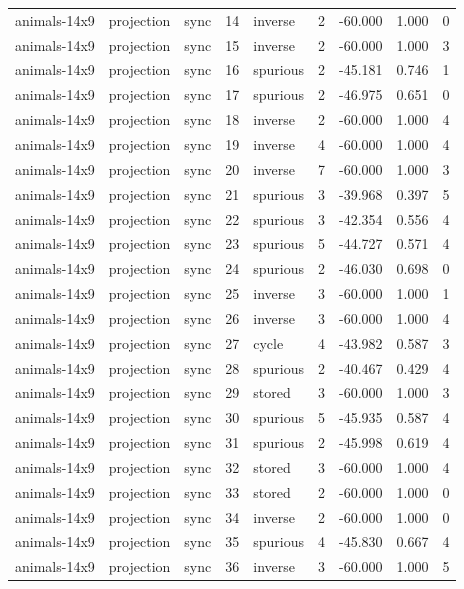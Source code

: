 \begin{tabular}{lllrlrrrr}
animals-14x9 & projection & sync & 14 & inverse & 2 & -60.000 & 1.000 & 0 \\
animals-14x9 & projection & sync & 15 & inverse & 2 & -60.000 & 1.000 & 3 \\
animals-14x9 & projection & sync & 16 & spurious & 2 & -45.181 & 0.746 & 1 \\
animals-14x9 & projection & sync & 17 & spurious & 2 & -46.975 & 0.651 & 0 \\
animals-14x9 & projection & sync & 18 & inverse & 2 & -60.000 & 1.000 & 4 \\
animals-14x9 & projection & sync & 19 & inverse & 4 & -60.000 & 1.000 & 4 \\
animals-14x9 & projection & sync & 20 & inverse & 7 & -60.000 & 1.000 & 3 \\
animals-14x9 & projection & sync & 21 & spurious & 3 & -39.968 & 0.397 & 5 \\
animals-14x9 & projection & sync & 22 & spurious & 3 & -42.354 & 0.556 & 4 \\
animals-14x9 & projection & sync & 23 & spurious & 5 & -44.727 & 0.571 & 4 \\
animals-14x9 & projection & sync & 24 & spurious & 2 & -46.030 & 0.698 & 0 \\
animals-14x9 & projection & sync & 25 & inverse & 3 & -60.000 & 1.000 & 1 \\
animals-14x9 & projection & sync & 26 & inverse & 3 & -60.000 & 1.000 & 4 \\
animals-14x9 & projection & sync & 27 & cycle & 4 & -43.982 & 0.587 & 3 \\
animals-14x9 & projection & sync & 28 & spurious & 2 & -40.467 & 0.429 & 4 \\
animals-14x9 & projection & sync & 29 & stored & 3 & -60.000 & 1.000 & 3 \\
animals-14x9 & projection & sync & 30 & spurious & 5 & -45.935 & 0.587 & 4 \\
animals-14x9 & projection & sync & 31 & spurious & 2 & -45.998 & 0.619 & 4 \\
animals-14x9 & projection & sync & 32 & stored & 3 & -60.000 & 1.000 & 4 \\
animals-14x9 & projection & sync & 33 & stored & 2 & -60.000 & 1.000 & 0 \\
animals-14x9 & projection & sync & 34 & inverse & 2 & -60.000 & 1.000 & 0 \\
animals-14x9 & projection & sync & 35 & spurious & 4 & -45.830 & 0.667 & 4 \\
animals-14x9 & projection & sync & 36 & inverse & 3 & -60.000 & 1.000 & 5 \\

\end{tabular}
